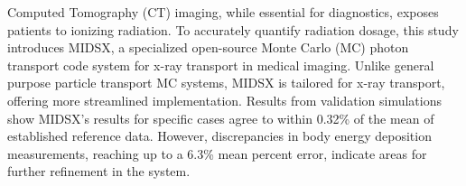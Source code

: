 Computed Tomography (CT) imaging, while essential for diagnostics, exposes patients to ionizing radiation. To accurately quantify radiation dosage, this study introduces MIDSX, a specialized open-source Monte Carlo (MC) photon transport code system for x-ray transport in medical imaging. Unlike general purpose particle transport MC systems, MIDSX is tailored for x-ray transport, offering more streamlined implementation. Results from validation simulations show MIDSX's results for specific cases agree to within 0.32\% of the mean of established reference data. However, discrepancies in body energy deposition measurements, reaching up to a 6.3\% mean percent error, indicate areas for further refinement in the system.